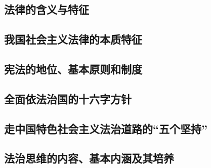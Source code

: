 \subsection{法律的含义与特征}
\subsection{我国社会主义法律的本质特征}
\subsection{宪法的地位、基本原则和制度}
\subsection{全面依法治国的十六字方针}
\subsection{走中国特色社会主义法治道路的“五个坚持”}
\subsection{法治思维的内容、基本内涵及其培养}
